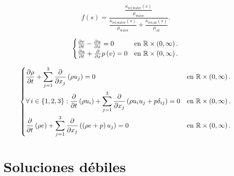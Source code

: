 \begin{example}
	\begin{equation*}
		f\left(s\right)=
		\frac{\frac{\kappa_{\text{rel,water}}\left(s\right)}{\mu_{\text{water}}}}{
			\frac{\kappa_{\text{rel,water}}\left(s\right)}{\mu_{\text{water}}}+
			\frac{\kappa_{\text{rel,oil}}\left(s\right)}{\mu_{\text{oil}}}
		}.
	\end{equation*}
\end{example}

\begin{example}[$p$-sistema]
	\begin{equation*}
		\begin{cases}
			\diffp{v}{t}-\diffp{u}{x}=0               &
			\text{en }\mathbb{R}\times\left(0,\infty\right). \\
			\diffp{u}{t}+\diffp{}{x}p\left(v\right)=0 &
			\text{en }\mathbb{R}\times\left(0,\infty\right).
		\end{cases}
	\end{equation*}
\end{example}

\begin{example}
	\begin{equation*}
		\begin{dcases}
			\diffp{\rho}{t}+
			\sum_{j=1}^{3}
			\diffp{}{x_{j}}
			\left(\rho u_{j}\right)=0                   &
			\text{en }\mathbb{R}\times\left(0,\infty\right). \\
			\forall i\in\left\{1,2,3\right\}:
			\diffp{}{t}
			\left(\rho u_{i}\right)+
			\sum_{j=1}^{3}
			\diffp{}{x_{j}}
			\left(\rho u_{i}u_{j}+p\delta_{ij}\right)=0 &
			\text{en }\mathbb{R}\times\left(0,\infty\right). \\
			\diffp{}{t}
			\left(\rho e\right)+
			\sum_{j=1}^{3}
			\diffp{}{x_{j}}
			\left(\left(\rho e+p\right)u_{j}\right)=0   &
			\text{en }\mathbb{R}\times\left(0,\infty\right).
		\end{dcases}
	\end{equation*}
\end{example}

\section{Soluciones débiles}

